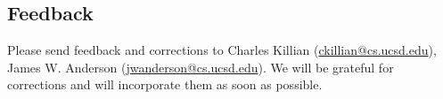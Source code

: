 \subsection{Feedback}
\label{sec:feedback}

Please send feedback and corrections to Charles Killian
(\href{mailto:ckillian@cs.ucsd.edu}{ckillian@cs.ucsd.edu}), James W. Anderson
(\href{mailto:jwanderson@cs.ucsd.edu}{jwanderson@cs.ucsd.edu}).  We will be
grateful for corrections and will incorporate them as soon as possible.
